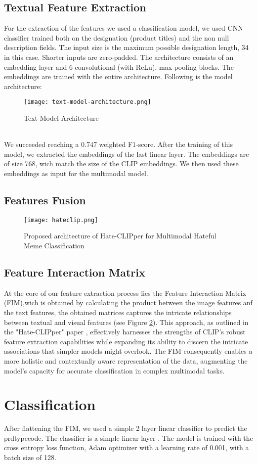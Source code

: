 \subsection{Textual Feature Extraction}

For the extraction of the features we used a classification model, we used CNN classifier trained both on the designation (product titles) and the non null description fields. The input size is the maximum possible designation length, 34 in this case. Shorter inputs are zero-padded. The architecture consists of an embedding layer and 6 convolutional (with ReLu), max-pooling blocks. The embeddings are trained with the entire architecture. Following is the model architecture:

\begin{figure}[H]
    \centering
    \texttt{[image: text-model-architecture.png]}
    \caption{Text Model Architecture}
    \label{fig:text-model}
\end{figure}
\\

We succeeded reaching a 0.747 weighted F1-score. After the training of this model, we extracted the embeddings of the last linear layer. The embeddings are of size 768, wich match the size of the CLIP embeddings. We then used these embeddings as input for the multimodal model.

\subsection{Features Fusion}

\begin{figure}[H]
    \centering
    \texttt{[image: hateclip.png]}
    \caption{Proposed architecture of Hate-CLIPper for Multimodal Hateful Meme Classification}
    \label{fig:hateclipper}
\end{figure}

\subsection{Feature Interaction Matrix}

At the core of our feature extraction process lies the Feature Interaction Matrix (FIM),wich is obtained by calculating the product between the image features anf the text features, the obtained matrices captures the intricate relationships between textual and visual features (see Figure \ref{fig:hateclipper}). This approach, as outlined in the "Hate-CLIPper" paper \cite{kumar2022hateclipper}, effectively harnesses the strengths of CLIP's robust feature extraction capabilities while expanding its ability to discern the intricate associations that simpler models might overlook. The FIM consequently enables a more holistic and contextually aware representation of the data, augmenting the model's capacity for accurate classification in complex multimodal tasks.

\section{Classification}

After flattening  the FIM, we used a simple 2 layer linear classifier to predict the prdtypecode. The classifier is a simple linear layer . The model is trained with the cross entropy loss function, Adam optimizer with a learning rate of 0.001, with a batch size of 128.